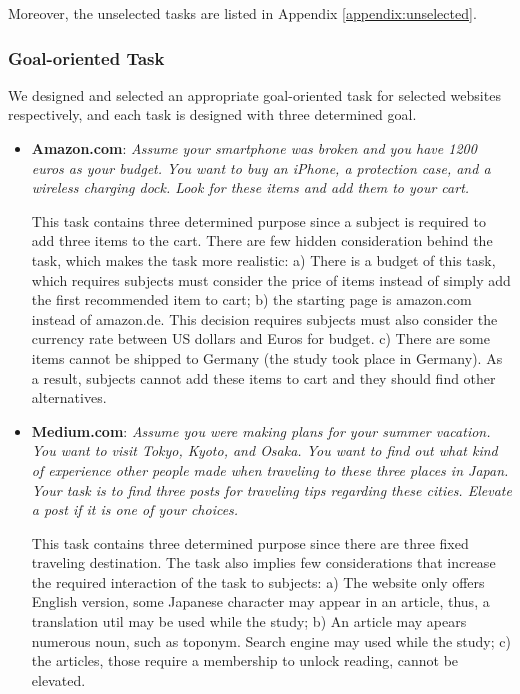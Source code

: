 Moreover, the unselected tasks are listed in Appendix \ref{appendix:unselected}.

\subsubsection{Goal-oriented Task}

We designed and selected an appropriate goal-oriented task for selected websites respectively,
and each task is designed with three determined goal.

\begin{itemize}
    \item \textbf{Amazon.com}: \emph{Assume your smartphone was broken and you have 1200 euros 
    as your budget. You want to buy an iPhone, a protection case, and a wireless 
    charging dock. Look for these items and add them to your cart.}

        This task contains three determined purpose since a subject is required to add three items
        to the cart. There are few hidden consideration behind the task, which makes the task
        more realistic: a) There is a budget of this task, which requires subjects must consider the
        price of items instead of simply add the first recommended item to cart; 
        b) the starting page is amazon.com instead of amazon.de. This decision requires
        subjects must also consider the currency rate between US dollars and Euros for budget.
        c) There are some items cannot be shipped to Germany (the study took place in Germany).
        As a result, subjects cannot add these items to cart and they should find other alternatives.

    \item \textbf{Medium.com}: \emph{Assume you were making plans for your summer vacation. 
        You want to visit Tokyo, Kyoto, and Osaka. You want to find out what kind of experience other people made 
        when traveling to these three places in Japan. Your task is to find three posts 
        for traveling tips regarding these cities. Elevate a post if it is one of your choices.}

        This task contains three determined purpose since there are three fixed traveling destination.
        The task also implies few considerations that increase the required interaction of the task to subjects:
        a) The website only offers English version, some Japanese character may appear in an article,
        thus, a translation util may be used while the study;
        b) An article may apears numerous noun, such as toponym. Search engine may used while the study;
        c) the articles, those require a membership to unlock reading, cannot be elevated. 



\end{itemize}
